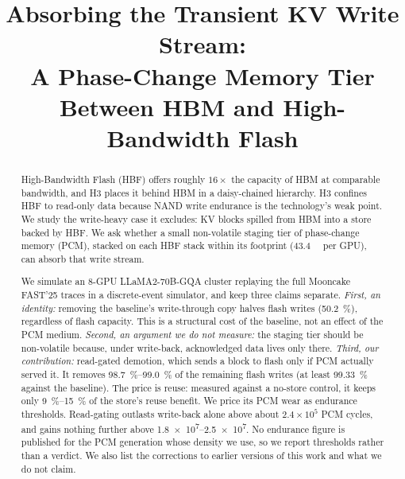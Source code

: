\documentclass[conference]{IEEEtran}
\begin{document}
\title{Absorbing the Transient KV Write Stream:\\
A Phase-Change Memory Tier Between HBM and High-Bandwidth Flash}

\author{
}

\maketitle

\begin{abstract}
High-Bandwidth Flash (HBF) offers roughly $16\times$ the capacity of HBM at
comparable bandwidth, and H3 places it behind HBM in a daisy-chained hierarchy.
H3 confines HBF to read-only data because NAND write endurance is the
technology's weak point. We study the write-heavy case it excludes: KV blocks
spilled from HBM into a store backed by HBF. We ask whether a small
non-volatile staging tier of phase-change memory (PCM), stacked on each HBF
stack within its footprint (\SI{43.4}{\gibi\byte} per GPU), can absorb that
write stream.

We simulate an 8-GPU LLaMA2-70B-GQA cluster replaying the full Mooncake FAST'25
traces in a discrete-event simulator, and keep three claims separate.
\emph{First, an identity:} removing the baseline's write-through copy halves
flash writes (\SI{50.2}{\percent}), regardless of flash capacity. This is a
structural cost of the baseline, not an effect of the PCM medium.
\emph{Second, an argument we do not measure:} the staging tier should be
non-volatile because, under write-back, acknowledged data lives only there.
\emph{Third, our contribution:} read-gated demotion, which sends a block to
flash only if PCM actually served it. It removes \SIrange{98.7}{99.0}{\percent}
of the remaining flash writes (at least \SI{99.33}{\percent} against the
baseline). The price is reuse: measured against a no-store control, it keeps
only \SIrange{9}{15}{\percent} of the store's reuse benefit. We price its PCM
wear as endurance thresholds. Read-gating outlasts write-back alone above about
$2.4\times10^{5}$ PCM cycles, and gains nothing further above
\numrange{1.8e7}{2.5e7}. No endurance figure is published for the PCM
generation whose density we use, so we report thresholds rather than a
verdict. We also list the corrections to earlier versions of this work and what
we do not claim.
\end{abstract}
\end{document}
